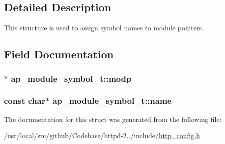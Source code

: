 \subsection{Detailed Description}
This structure is used to assign symbol names to module pointers. 

\subsection{Field Documentation}
\subsubsection[{\texorpdfstring{modp}{modp}}]{$\ast$ ap\+\_\+module\+\_\+symbol\+\_\+t\+::modp}\hypertarget{structap__module__symbol__t_a795db84f5d690fd488d57a1015ca0682}{}\label{structap__module__symbol__t_a795db84f5d690fd488d57a1015ca0682}
\subsubsection[{\texorpdfstring{name}{name}}]{\setlength{\rightskip}{0pt plus 5cm}const char$\ast$ ap\+\_\+module\+\_\+symbol\+\_\+t\+::name}\hypertarget{structap__module__symbol__t_af1f2cf8f12dac28f9fdb54fc376e9b5b}{}\label{structap__module__symbol__t_af1f2cf8f12dac28f9fdb54fc376e9b5b}


The documentation for this struct was generated from the following file\+:\begin{DoxyCompactItemize}
\item 
/usr/local/src/github/\+Codebase/httpd-\/2../include/\hyperlink{http__config_8h}{http\+\_\+config.\+h}\end{DoxyCompactItemize}
